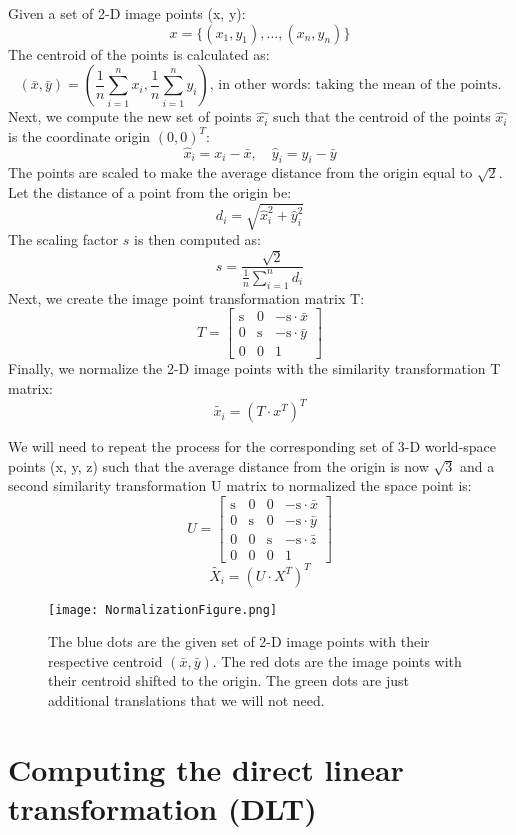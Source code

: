 \documentclass[12pt]{article}
\begin{document}
\noindent Given a set of 2-D image points (x, y):
\[
    x = \{(x_1, y_1), ..., (x_n, y_n)\}
\]
The centroid of the points is calculated as:
\[
        (\bar{x}, \bar{y}) = ( \frac{1}{n}\sum_{i=1}^{n} x_i,  \frac{1}{n}\sum_{i=1}^{n} y_i)
        \text{, in other words: taking the mean of the points.}
\]
Next, we compute the new set of points \( \hat{x_i} \) such that the centroid of the points \( \hat{x_i} \) is the coordinate origin \( (0, 0)^T \):
\[
    \hat{x}_i = x_i - \bar{x}, \quad \hat{y}_i = y_i - \bar{y}
\]
The points are scaled to make the average distance from the origin equal to \( \sqrt{2} \). Let the distance of a point from the origin be:
\[
    d_i = \sqrt{\hat{x}_i^2 + \hat{y}_i^2}
\]
The scaling factor \( s \) is then computed as:
\[
    s = \frac{\sqrt{2}}{\frac{1}{n} \sum_{i=1}^{n} d_i}
\]
Next, we create the image point transformation matrix T:
\[
T = \begin{bmatrix}
\text{s} & 0 & -\text{s} \cdot \bar{x} \\
0 & \text{s} & -\text{s} \cdot \bar{y} \\
0 & 0 & 1
\end{bmatrix}
\]
Finally, we normalize the 2-D image points with the similarity transformation T matrix:
\[
\tilde{x_i} = (T \cdot x^T)^T
\]

\noindent We will need to repeat the process for the corresponding set of 3-D world-space points (x, y, z) such that the average distance from the origin is now \( \sqrt{3} \) and a second similarity transformation U matrix to normalized the space point is:
\[
U = \begin{bmatrix}
\text{s} & 0 & 0 & -\text{s} \cdot \bar{x} \\
0 & \text{s} & 0 & -\text{s} \cdot \bar{y} \\
0 & 0 & \text{s} & -\text{s} \cdot \bar{z} \\
0 & 0 & 0 & 1
\end{bmatrix}
\]
\[
\tilde{X_i} = (U \cdot X^T)^T
\]
\newpage

\begin{figure}[ht]
    \centering
    \texttt{[image: NormalizationFigure.png]}
    \caption{The blue dots are the given set of 2-D image points with their respective centroid \( (\bar{x}, \bar{y}) \). The red dots are the image points with their centroid shifted to the origin. The green dots are just additional translations that we will not need. }
\end{figure}

\section{Computing the direct linear transformation (DLT)}
\end{document}
